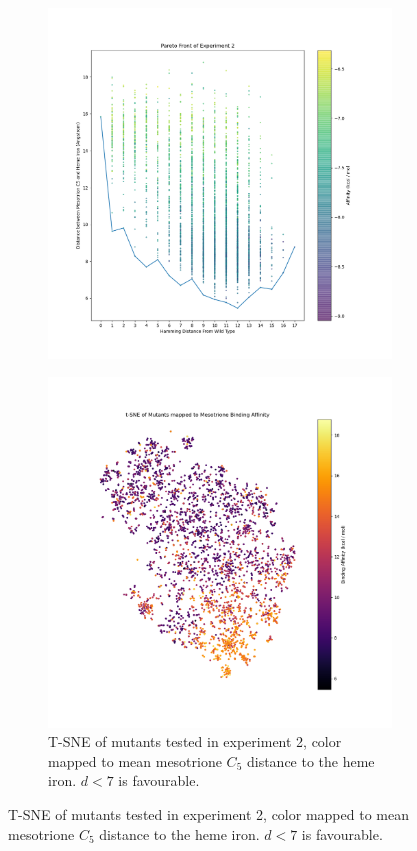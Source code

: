\documentclass{article}
\begin{document}
\begin{figure}[H]
\begin{subfigure}{0.49\textwidth}
		\includegraphics[width=\linewidth]{figs/uvwsl-pareto.png}
	\end{subfigure}
	\begin{subfigure}{0.49\textwidth}
		\caption{\label{exp2-tsne} T-SNE of mutants tested in experiment 2, color mapped to mean mesotrione $C_5$ distance to the heme iron. $d < 7$ is favourable.}
		\includegraphics[width=\linewidth]{figs/uvwsl-ft-tsne.png}
	\end{subfigure}
\end{figure}
\restoregeometry
\end{document}
